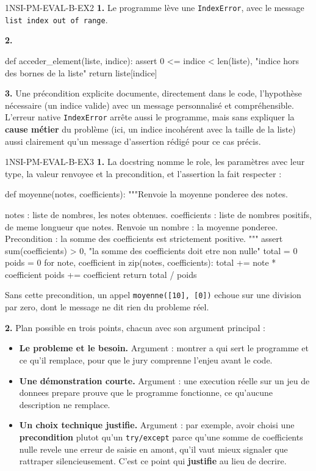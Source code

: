 \begin{corrige}{1NSI-PM-EVAL-B-EX2}
\textbf{1.} Le programme lève une \lstinline{IndexError}, avec le message
\lstinline{list index out of range}.

\textbf{2.}
\begin{python}
def acceder_element(liste, indice):
    assert 0 <= indice < len(liste), "indice hors des bornes de la liste"
    return liste[indice]
\end{python}

\textbf{3.} Une précondition explicite documente, directement dans le code, l'hypothèse
nécessaire (un indice valide) avec un message personnalisé et compréhensible. L'erreur
native \lstinline{IndexError} arrête aussi le programme, mais sans expliquer la
\textbf{cause métier} du problème (ici, un indice incohérent avec la taille de la liste)
aussi clairement qu'un message d'assertion rédigé pour ce cas précis.
\end{corrige}

\begin{corrige}{1NSI-PM-EVAL-B-EX3}
\textbf{1.} La docstring nomme le role, les paramètres avec leur type, la valeur renvoyee
et la precondition, et l'assertion la fait respecter :

\begin{python}
def moyenne(notes, coefficients):
    """Renvoie la moyenne ponderee des notes.

    notes : liste de nombres, les notes obtenues.
    coefficients : liste de nombres positifs, de meme longueur que notes.
    Renvoie un nombre : la moyenne ponderee.
    Precondition : la somme des coefficients est strictement positive.
    """
    assert sum(coefficients) > 0, "la somme des coefficients doit etre non nulle"
    total = 0
    poids = 0
    for note, coefficient in zip(notes, coefficients):
        total += note * coefficient
        poids += coefficient
    return total / poids
\end{python}

Sans cette precondition, un appel \lstinline{moyenne([10], [0])} echoue sur une division par
zero, dont le message ne dit rien du probleme réel.

\textbf{2.} Plan possible en trois points, chacun avec son argument principal :
\begin{itemize}
  \item \textbf{Le probleme et le besoin.} Argument : montrer a qui sert le programme et
  ce qu'il remplace, pour que le jury comprenne l'enjeu avant le code.
  \item \textbf{Une démonstration courte.} Argument : une execution réelle sur un jeu de
  donnees prepare prouve que le programme fonctionne, ce qu'aucune description ne remplace.
  \item \textbf{Un choix technique justifie.} Argument : par exemple, avoir choisi une
  \textbf{precondition} plutot qu'un \lstinline{try/except} parce qu'une somme de
  coefficients nulle revele une erreur de saisie en amont, qu'il vaut mieux signaler que
  rattraper silencieusement. C'est ce point qui \textbf{justifie} au lieu de decrire.
\end{itemize}
\end{corrige}
